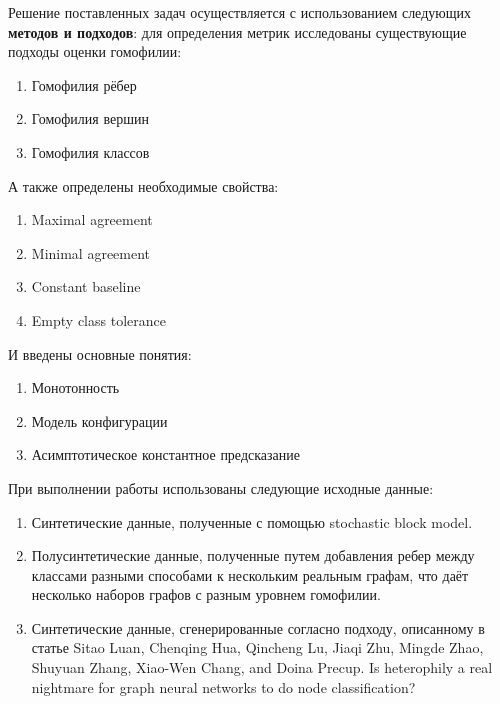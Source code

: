 \documentclass[a4paper,14pt]{article}
\begin{document}
	Решение поставленных задач осуществляется с использованием следующих \textbf{методов и подходов}: для определения метрик исследованы существующие подходы оценки гомофилии:
	
	\begin{enumerate}
		\item Гомофилия рёбер
		
		\item Гомофилия вершин
		
		\item Гомофилия классов
	\end{enumerate}

	А также определены необходимые свойства: 
	
	\begin{enumerate}
		\item Maximal agreement
		
		\item Minimal agreement
		
		\item Constant baseline
		
		\item Empty class tolerance
	\end{enumerate}
	
	И введены основные понятия:
	
	\begin{enumerate}
		\item Монотонность
		
		\item Модель конфигурации
		
		\item Асимптотическое константное предсказание
	\end{enumerate}
	
	При выполнении работы использованы следующие исходные данные:
	
	\begin{enumerate}
		\item Синтетические данные, полученные с помощью stochastic block model.
		
		\item Полусинтетические данные, полученные путем добавления ребер между классами разными способами к нескольким реальным графам, что даёт несколько наборов графов с разным уровнем гомофилии.
	
		\item Синтетические данные, сгенерированные согласно подходу, описанному в статье Sitao Luan, Chenqing Hua, Qincheng Lu, Jiaqi Zhu, Mingde Zhao, Shuyuan Zhang, Xiao-Wen Chang, and Doina Precup. Is heterophily a real nightmare for graph neural networks to do node classification?
	\end{enumerate}
	
\end{document}
